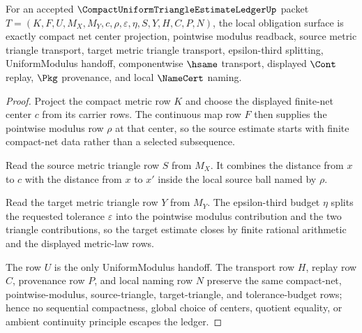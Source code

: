 \begin{theorem}
\label{thm:compact-uniform-triangle-estimate-ledger-obligations}
For an accepted $\CompactUniformTriangleEstimateLedgerUp$ packet $T=(K,F,U,M_X,M_Y,c,\rho,\varepsilon,\eta,S,Y,H,C,P,N)$, the local obligation surface is exactly compact net center projection, pointwise modulus readback, source metric triangle transport, target metric triangle transport, epsilon-third splitting, UniformModulus handoff, componentwise $\hsame$ transport, displayed $\Cont$ replay, $\Pkg$ provenance, and local $\NameCert$ naming.
\end{theorem}
\begin{proof}
Project the compact metric row $K$ and choose the displayed finite-net center $c$ from its carrier rows. The continuous map row $F$ then supplies the pointwise modulus row $\rho$ at that center, so the source estimate starts with finite compact-net data rather than a selected subsequence.

Read the source metric triangle row $S$ from $M_X$. It combines the distance from $x$ to $c$ with the distance from $x$ to $x'$ inside the local source ball named by $\rho$.

Read the target metric triangle row $Y$ from $M_Y$. The epsilon-third budget $\eta$ splits the requested tolerance $\varepsilon$ into the pointwise modulus contribution and the two triangle contributions, so the target estimate closes by finite rational arithmetic and the displayed metric-law rows.

The row $U$ is the only UniformModulus handoff. The transport row $H$, replay row $C$, provenance row $P$, and local naming row $N$ preserve the same compact-net, pointwise-modulus, source-triangle, target-triangle, and tolerance-budget rows; hence no sequential compactness, global choice of centers, quotient equality, or ambient continuity principle escapes the ledger.
\end{proof}



